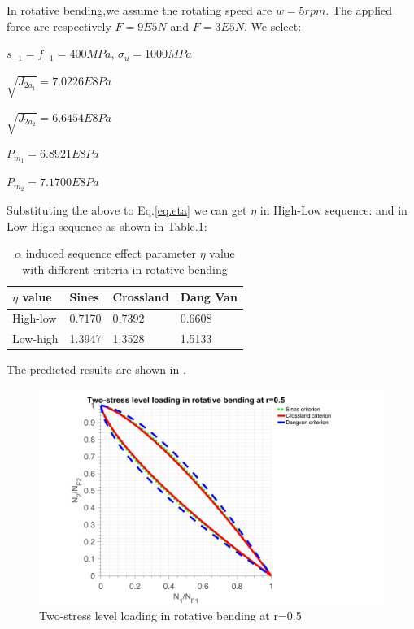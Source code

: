 In rotative bending,we assume the rotating speed are $w=5rpm$. The applied force are respectively $F=9E5 N$ and $F=3E5 N$. We select:

$s_{-1}=f_{-1}=400MPa$, $\sigma_{u}=1000MPa$

\vspace{6pt}
$\sqrt{J_{2a_1}}=7.0226E8 Pa$

\vspace{6pt}
$\sqrt{J_{2a_2}}=6.6454E8 Pa$

\vspace{6pt}
$P_{m_1}=6.8921E8 Pa$

\vspace{6pt}
$P_{m_2}=7.1700E8 Pa$

Substituting the above to Eq.\eqref{eq.eta} we can get $\eta$ in High-Low sequence:
and in Low-High sequence as shown in Table.\ref{tab.etarb}:
\begin{table}[!h]
	\centering
	\begin{tabular}{llll}
		\hline
		$\eta$ value   & Sines  & Crossland & Dang Van \\ \hline
		High-low & 0.7170 &  0.7392 &   0.6608   \\
		Low-high & 1.3947 & 1.3528   &  1.5133  \\ \hline
	\end{tabular}
	\caption{$\alpha$ induced sequence effect parameter $\eta$ value with different criteria in rotative bending}
	\label{tab.etarb}
\end{table}

The predicted results are shown in .

\begin{figure}[h!]
	\centering
	\includegraphics[width=\textwidth]{figures//2stressRB.png} 
	\caption{Two-stress level loading in rotative bending at r=0.5}
	\label{2stressRB}
\end{figure}
\clearpage

